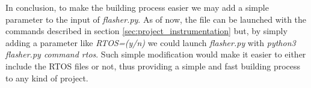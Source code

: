 In conclusion, to make the building process easier we may add a simple parameter
to the input of \textit{flasher.py}. As of now, the file can be launched with
the commands described in section \ref{sec:project_instrumentation} but, by simply
adding a parameter like \textit{RTOS=(y/n)} we could launch \textit{flasher.py} with
\textit{python3 flasher.py command rtos}. Such simple modification would make it
easier to either include the RTOS files or not, thus providing a simple and fast
building process to any kind of project.
